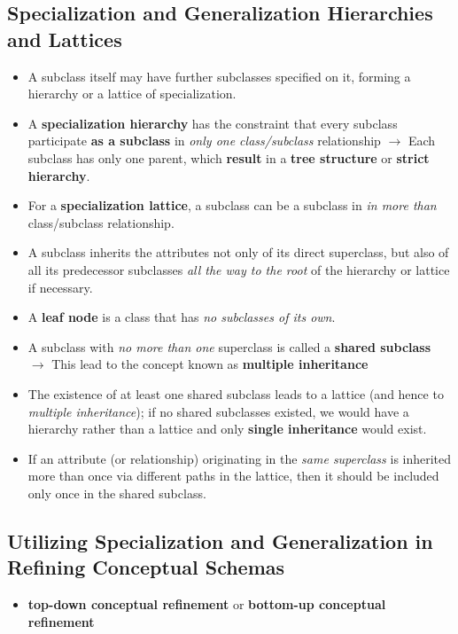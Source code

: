\documentclass[10pt]{article}
\begin{document}
\subsection{Specialization and Generalization Hierarchies and Lattices}
\begin{itemize}
	\item A subclass itself may have further subclasses specified on it, forming a hierarchy or a lattice of specialization.
	\item A \textbf{specialization hierarchy} has the constraint that every subclass participate \textbf{as a subclass} in \textit{only one class/subclass} relationship $\rightarrow$ Each subclass has only one parent, which \textbf{result} in a \textbf{tree structure} or \textbf{strict hierarchy}.
	\item For a \textbf{specialization lattice}, a subclass can be a subclass in \textit{in more than} class/subclass relationship.
	\item A subclass inherits the attributes not only of its direct superclass, but also of all its predecessor subclasses \textit{all the way to the root} of the hierarchy or lattice if necessary.
	\item A \textbf{leaf node} is a class that has \textit{no subclasses of its own}.
	\item A subclass with \textit{no more than one} superclass is called a \textbf{shared subclass} $\rightarrow$ This lead to the concept known as \textbf{multiple inheritance}
	\item The existence of at least one shared subclass leads to a lattice (and hence to \textit{multiple inheritance}); if no shared subclasses existed, we would have a hierarchy rather than a lattice and only \textbf{single inheritance} would exist.
	\item If an attribute (or relationship) originating in the \textit{same superclass} is inherited more than once via different paths in the lattice, then it should be included only once in the shared subclass.   
\end{itemize}

\subsection{Utilizing Specialization and Generalization in Refining Conceptual Schemas}
\begin{itemize}
	\item \textbf{top-down conceptual refinement} or \textbf{bottom-up conceptual refinement}
\end{itemize}
\end{document}

